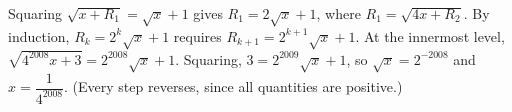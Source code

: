Squaring $\sqrt{x+R_1}=\sqrt x+1$ gives $R_1=2\sqrt x+1$, where $R_1=\sqrt{4x+R_2}$. By induction, $R_k=2^k\sqrt x+1$ requires $R_{k+1}=2^{k+1}\sqrt x+1$. At the innermost level, $\sqrt{4^{2008}x+3}=2^{2008}\sqrt x+1$. Squaring, $3=2^{2009}\sqrt x+1$, so $\sqrt x=2^{-2008}$ and $x=\boxed{\dfrac1{4^{2008}}}$. (Every step reverses, since all quantities are positive.)
